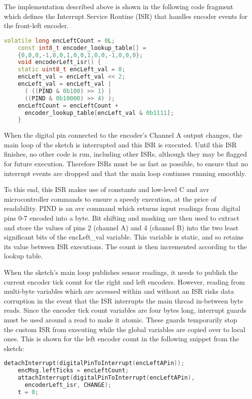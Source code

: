 The implementation described above is shown in the following code fragment which defines the Interrupt Service Routine (ISR) that handles encoder events for the front-left encoder. \cite{encoderBlog}
\begin{mdframed}[backgroundcolor=light-gray, roundcorner=10pt,leftmargin=1, rightmargin=1, innerleftmargin=15, innertopmargin=15,innerbottommargin=15, outerlinewidth=1, linecolor=light-gray]
	\begin{lstlisting}[language=C++]
	volatile long encLeftCount = 0L;
	const int8_t encoder_lookup_table[] =
	{0,0,0,-1,0,0,1,0,0,1,0,0,-1,0,0,0};
	void encoderLeft_isr() {
	static uint8_t encLeft_val = 0;
	encLeft_val = encLeft_val << 2;
	encLeft_val = encLeft_val |
	  ( ((PIND & 0b100) >> 1) | 
	  ((PIND & 0b10000) >> 4) );
	encLeftCount = encLeftCount +
	  encoder_lookup_table[encLeft_val & 0b1111];
	}
	\end{lstlisting}
\end{mdframed}

When the digital pin connected to the encoder's Channel A output changes, the main loop of the sketch is interrupted and this ISR is executed. Until this ISR finishes, no other code is run, including other ISRs, although they may be flagged for future execution. Therefore ISRs must be as fast as possible, to ensure that no interrupt events are dropped and that the main loop continues running smoothly.

To this end, this ISR makes use of constants and low-level C and avr microcontroller commands to ensure a speedy execution, at the price of readability. PIND is an avr command which returns input readings from digital pins 0-7 encoded into a byte. Bit shifting and masking are then used to extract and store the values of pins 2 (channel A) and 4 (channel B) into the two least significant bits of the encLeft\_val variable. This variable is static, and so retains its value between ISR executions. The count is then incremented according to the lookup table.

When the sketch's main loop publishes sensor readings, it needs to publish the current encoder tick count for the right and left encoders. However, reading from multi-byte variables which are accessed within and without an ISR risks data corruption in the event that the ISR interrupts the main thread in-between byte reads. Since the encoder tick count variables are four bytes long, interrupt guards must be used around a read to make it atomic. These guards temporarily stop the custom ISR from executing while the global variables are copied over to local ones. This is shown for the left encoder count in the following snippet from the sketch:
\begin{mdframed}[backgroundcolor=light-gray, roundcorner=10pt,leftmargin=1, rightmargin=1, innerleftmargin=15, innertopmargin=15,innerbottommargin=15, outerlinewidth=1, linecolor=light-gray]
	\begin{lstlisting}[language=C++]
	detachInterrupt(digitalPinToInterrupt(encLeftAPin));
	encMsg.leftTicks = encLeftCount;
	attachInterrupt(digitalPinToInterrupt(encLeftAPin),
	  encoderLeft_isr, CHANGE);
	t = 0;
	\end{lstlisting}
\end{mdframed}

